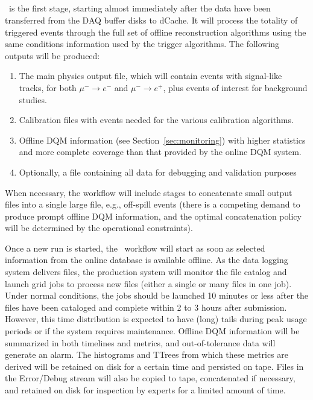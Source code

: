 \subsection{\passone}
\passone\ is the first stage, starting almost immediately after the data have been transferred from the DAQ buffer disks to dCache. It will process the totality of triggered events through the full set of offline reconstruction algorithms using the same conditions information used by the trigger algorithms. The following outputs will be produced:
\begin{enumerate}
 \item The main physics output file, which will contain events with signal-like tracks, for both $\mu^-\to e^-$ and $\mu^-\to e^+$, plus events of interest for background studies.
 \item Calibration files with events needed for the various calibration algorithms.
 \item Offline DQM information (see Section~\ref{sec:monitoring}) with higher statistics and more complete coverage than that provided by the online DQM system.
 \item Optionally, a file containing all data for debugging and validation purposes
\end{enumerate}
When necessary, the workflow will include stages to concatenate small output files into a single large file, e.g., off-spill events (there is a competing demand to produce prompt offline DQM information, and the optimal concatenation policy will be determined by the operational constraints).

Once a new run is started, the \passone\ workflow will start as soon as selected information from the online database is available offline. As the data logging system delivers files, the production system will monitor the file catalog and launch grid jobs to process new files (either a single or many files in one job). Under normal conditions, the jobs should be launched 10 minutes or less after the files have been cataloged and complete within 2 to 3 hours after submission. However, this time distribution is expected to have (long) tails during peak usage periods or if the system requires maintenance. Offline DQM information will be summarized in both timelines and metrics, and out-of-tolerance data will generate an alarm. The histograms and TTrees from which these metrics are derived will be retained on disk for a certain time and persisted on tape. Files in the Error/Debug stream will also be copied to tape, concatenated if necessary, and retained on disk for inspection by experts for a limited amount of time. 

